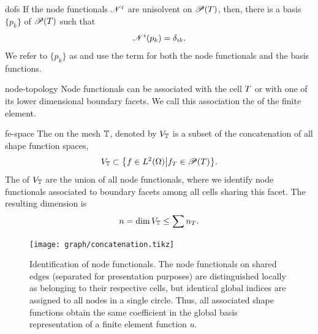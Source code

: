 \begin{Notation}{dofs}
  If the node functionals $\mathscr N^i$ are unisolvent on
  $\mathscr P(T)$, then, there is a basis $\{p_k\}$ of $\mathscr P(T)$
  such that
  \begin{gather}
    \mathscr N^i(p_k) = \delta_{ik}.
  \end{gather}
  We refer to $\{p_k\}$ as  and use the
  term  for both the node functionals and
  the basis functions.
\end{Notation}

\begin{Definition}{node-topology}
  Node functionals can be associated with the cell $T$ or with one
  of its lower dimensional boundary facets. We call this association
  the  of the finite element.
\end{Definition}

\begin{Definition}{fe-space}
  The  on the mesh $\mathbb T$, denoted by
  $V_\mathbb T$ is a subset of the concatenation of all shape function
  spaces,
  \begin{gather}
    V_\mathbb T \subset \bigl\{ f\in L^2(\Omega) \big|
    f_{T} \in \mathscr P(T) \bigr\}.
  \end{gather}
  The  of $V_\mathbb T$ are the union of all
  node functionals, where we identify node functionals associated to
  boundary facets among all cells sharing this facet. The resulting
  dimension is
  \begin{gather}
    n = \dim V_\mathbb T \le \sum n_T.
  \end{gather}
\end{Definition}

\begin{figure}[tp]
  \begin{center}
    \texttt{[image: graph/concatenation.tikz]}
  \end{center}
  \caption{Identification of node functionals. The node functionals on
    shared edges (separated for presentation purposes) are
    distinguished locally as belonging to their respective cells, but
    identical global indices are assigned to all nodes in a single
    circle. Thus, all associated shape functions obtain the same
    coefficient in the global basis representation of a finite element
    function $u$.}
  \label{fig:nodes-identification}
\end{figure}

